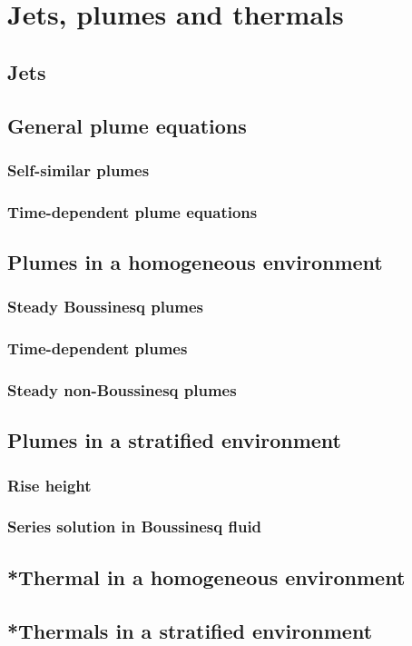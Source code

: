 \newpage
\section{Jets, plumes and thermals}

\subsection{Jets}
\subsection{General plume equations}
\subsubsection{Self-similar plumes}
\subsubsection{Time-dependent plume equations}

\subsection{Plumes in a homogeneous environment}
\subsubsection{Steady Boussinesq plumes}
\subsubsection{Time-dependent plumes}
\subsubsection{Steady non-Boussinesq plumes}

\subsection{Plumes in a stratified environment}
\subsubsection{Rise height}
\subsubsection{Series solution in Boussinesq fluid}

\subsection{*Thermal in a homogeneous environment}
\subsection{*Thermals in a stratified environment}